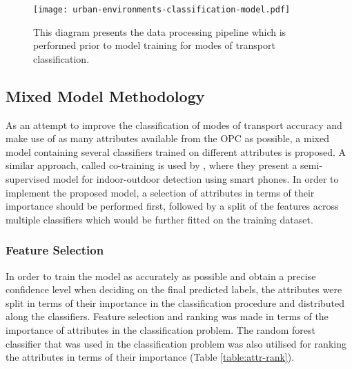 \documentclass[bsc,frontabs,twoside,singlespacing, parskip,deptreport]{infthesis}     %
\begin{document}
\begin{figure}[h!]
  \center
  \texttt{[image: urban-environments-classification-model.pdf]}
  \caption{This diagram presents the data processing pipeline which is performed prior to model training for modes of transport classification.}
  \label{fig:urban-environments-classification-model}
\end{figure}

\subsection{Mixed Model Methodology}
\label{subsec:mixed-model-methodology}

As an attempt to improve the classification of modes of transport accuracy and make use of as many attributes available from the OPC as possible, a mixed model containing several classifiers trained on different attributes is proposed. A similar approach, called co-training is used by \cite{Radu2014}, where they present a semi-supervised model for indoor-outdoor detection using smart phones. In order to implement the proposed model, a selection of attributes in terms of their importance should be performed first, followed by a split of the features across multiple classifiers which would be further fitted on the training dataset.


\subsubsection{Feature Selection}
\label{subsubsec:feat-selection}

In order to train the model as accurately as possible and obtain a precise confidence level when deciding on the final predicted labels, the attributes were split in terms of their importance in the classification procedure and distributed along the classifiers. Feature selection and ranking was made in terms of the importance of attributes in the classification problem. The random forest classifier that was used in the classification problem was also utilised for ranking the attributes in terms of their importance (Table \ref{table:attr-rank}).
\end{document}
